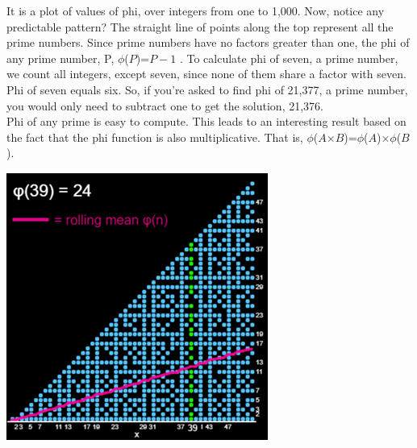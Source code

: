 \documentclass{report}
\begin{document}
It is a plot of values of phi, over integers from one to 1,000. Now, notice any predictable pattern? The straight line of points along the top represent all the prime numbers. Since prime numbers have no factors greater than one, the phi of any prime number, P,   $\phi$($P$)=$P-1$  . To calculate phi of seven, a prime number, we count all integers, except seven, since none of them share a factor with seven. Phi of seven equals six. So, if you're asked to find phi of 21,377, a prime number, you would only need to subtract one to get the solution, 21,376. \\
Phi of any prime is easy to compute. This leads to an interesting result based on the fact that the phi function is also multiplicative. That is,   $\phi$($A$×$B$)=$\phi$($A$)×$\phi$($B$).
\begin{center}
	\includegraphics[scale=1]{38.png}
\end{center}

\newpage
\end{document}

